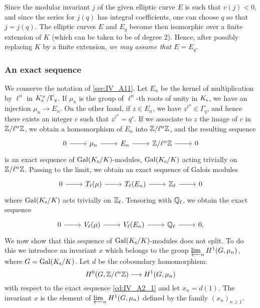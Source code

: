 \begin{subappendices}
Since the modular invariant $j$ of the given elliptic curve $E$
is such that $v(j) < 0$, and since the series for $j(q)$ has integral
coefficients, one can choose $q$ so that $j = j(q)$. The elliptic curves
$E$ and $E_q$ become then isomorphic over a finite extension of $K$
(which can be taken to be of degree 2). Hence, after possibly 
replacing $K$ by a finite extension, \emph{we may assume that $E = E_q$}.

\subsubsection{An exact sequence}
\label{sec:IV_A12}
We conserve the notation of \ref{sec:IV_A11}.
\dpage
Let $E_n$ be the kernel of multiplication by $\ell^n$ in $K_{\mathrm{s}}^\times/\Gamma_q$. If $\mu_n$ is the group of $\ell^n$-th roots of unity in
$K_{\mathrm{s}}$, we have an injection $\mu_n \to E_n$. On the other hand, if $z \in
E_n$, we have $z^{\ell^n} \in \Gamma_q$, and hence there exists an integer $c$
such that $z^{\ell^n} = q^c$. If we associate to $z$ the image of $c$ in
$\mathbb{Z}/\ell^n\mathbb{Z}$, we obtain a homomorphism of $E_n$ into $\mathbb{Z}/\ell^n\mathbb{Z}$, and the
resulting sequence
\begin{equation}
	\begin{tikzcd}
		0 \rar & \mu_n \rar & E_n \rar & \Z/\ell^n\Z \rar & 0
	\end{tikzcd}
	\label{cd:IV_A2_1}
\end{equation}
is an exact sequence of $\operatorname{Gal}(K_{\mathrm{s}}/K)$-modules, $\operatorname{Gal}(K_{\mathrm{s}}/K)$ acting
trivially on $\mathbb{Z}/\ell^n\mathbb{Z}$. Passing to the limit, we obtain an exact sequence
of Galois modules
\begin{equation}
	\begin{tikzcd}
		0 \rar & T_\ell(\mu) \rar & T_\ell(E_n) \rar & \Z_\ell \rar & 0
	\end{tikzcd}
\end{equation}
where $\operatorname{Gal}(K_{\mathrm{s}}/K)$ acts trivially on $\mathbb{Z}_\ell$. Tensoring with $\mathbb{Q}_\ell$, we
obtain the exact sequence
\begin{equation}
	\begin{tikzcd}
		0 \rar & V_\ell(\mu) \rar & V_\ell(E_n) \rar & \Q_\ell \rar & 0.
	\end{tikzcd}
	\label{cd:IV_A2_3}
\end{equation}
We now show that this sequence of $\operatorname{Gal}(K_{\mathrm{s}}/K)$-modules does not split. To
do this we introduce an invariant $x$ which belongs to the group $\varprojlim_n
H^1(G, \mu_n)$, where $G = \operatorname{Gal}(K_{\mathrm{s}}/K)$. Let $d$ be the coboundary
homomorphism:
\[
	H^0(G, \mathbb{Z}/\ell^n\mathbb{Z}) \longrightarrow H^1(G, \mu_n)
\]
with respect to the exact sequence \eqref{cd:IV_A2_1} and let $x_n = d(1)$. The invariant
$x$ is the element of $\varprojlim_n H^1(G, \mu_n)$ defined by the family $(x_n)_{n \ge 1}$.


\end{subappendices}

